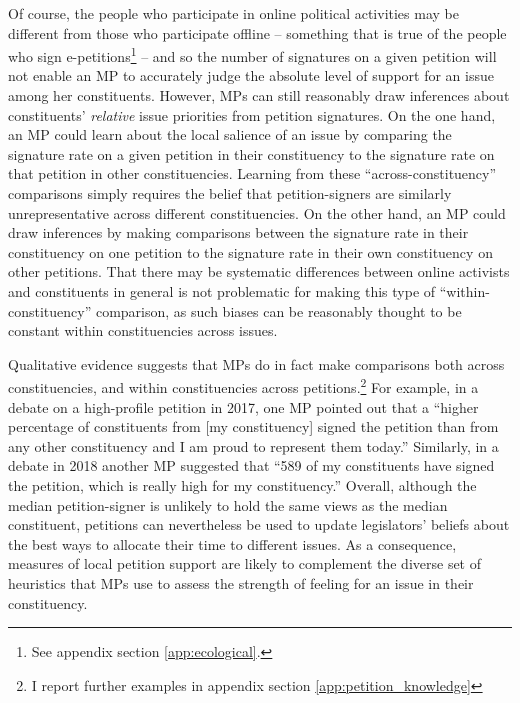 \documentclass[12pt]{article}
\begin{document}
Of course, the people who participate in online political activities may be different from those who participate offline -- something that is true of the people who sign e-petitions\footnote{See appendix section \ref{app:ecological}.} -- and so the number of signatures on a given petition will not enable an MP to accurately judge the absolute level of support for an issue among her constituents. However, MPs can still reasonably draw inferences about constituents' \emph{relative} issue priorities from petition signatures.  On the one hand, an MP could learn about the local salience of an issue by comparing the signature rate on a given petition in their constituency to the signature rate on that petition in other constituencies. Learning from these ``across-constituency'' comparisons simply requires the belief that petition-signers are similarly unrepresentative across different constituencies.  On the other hand, an MP could draw inferences by making comparisons between the signature rate in their constituency on one petition to the signature rate in their own constituency on other petitions. That there may be systematic differences between online activists and constituents in general is not problematic for making this type of ``within-constituency'' comparison, as such biases can be reasonably thought to be constant within constituencies across issues. 

Qualitative evidence suggests that MPs do in fact make comparisons both across constituencies, and within constituencies across petitions.\footnote{I report further examples in appendix section \ref{app:petition_knowledge}} For example, in a debate on a high-profile petition in 2017, one MP pointed out that a ``higher percentage of constituents from [my constituency] signed the petition than from any other constituency and I am proud to represent them today.''  \citep{lucas2017speech} Similarly, in a debate in 2018 another MP suggested that ``589 of my constituents have signed the petition, which is really high for my constituency.''  \citep{Hodgson2018speech} Overall, although the median petition-signer is unlikely to hold the same views as the median constituent, petitions can nevertheless be used to update legislators' beliefs about the best ways to allocate their time to different issues. As a consequence, measures of local petition support are likely to complement the diverse set of heuristics that MPs use to assess the strength of feeling for an issue in their constituency.
\end{document}
